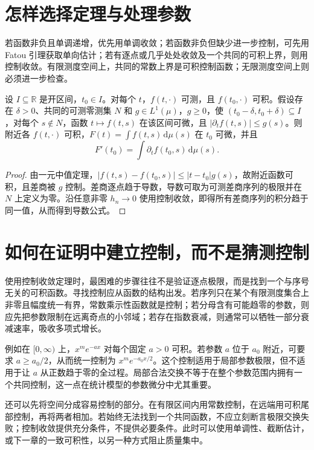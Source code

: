 \documentclass[UTF8,12pt,a4paper,fontset=fandol]{ctexbook}
\begin{document}
\section{怎样选择定理与处理参数}
若函数非负且单调递增，优先用单调收敛；若函数非负但缺少进一步控制，可先用 Fatou 引理获取单向估计；若有逐点或几乎处处收敛及一个共同的可积上界，则用控制收敛。有限测度空间上，共同的常数上界是可积控制函数；无限测度空间上则必须进一步检查。

\begin{proposition}[一个积分号下求导的充分条件]
设 $I\subseteq\mathbb R$ 是开区间，$t_0\in I$。对每个 $t$，$f(t,\cdot)$ 可测，且 $f(t_0,\cdot)$ 可积。假设存在 $\delta>0$、共同的可测零测集 $N$ 和 $g\in L^1(\mu)$，$g\geq0$，使 $(t_0-\delta,t_0+\delta)\subseteq I$，对每个 $s\notin N$，函数 $t\mapsto f(t,s)$ 在该区间可微，且 $|\partial_tf(t,s)|\leq g(s)$。则附近各 $f(t,\cdot)$ 可积，$F(t)=\int f(t,s)\,\mathrm d\mu(s)$ 在 $t_0$ 可微，并且
\[
 F'(t_0)=\int\partial_tf(t_0,s)\,\mathrm d\mu(s).
\]
\end{proposition}
\begin{proof}
由一元中值定理，$|f(t,s)-f(t_0,s)|\leq|t-t_0|g(s)$，故附近函数可积，且差商被 $g$ 控制。差商逐点趋于导数，导数可取为可测差商序列的极限并在 $N$ 上定义为零。沿任意非零 $h_n\to0$ 使用控制收敛，即得所有差商序列的积分趋于同一值，从而得到导数公式。
\end{proof}

\section{如何在证明中建立控制，而不是猜测控制}
使用控制收敛定理时，最困难的步骤往往不是验证逐点极限，而是找到一个与序号无关的可积函数。寻找控制应从函数的结构出发。若序列只在某个有限测度集合上非零且幅度统一有界，常数乘示性函数就是控制；若分母含有可能趋零的参数，则应先把参数限制在远离奇点的小邻域；若存在指数衰减，则通常可以牺牲一部分衰减速率，吸收多项式增长。

例如在 $[0,\infty)$ 上，$x^m e^{-ax}$ 对每个固定 $a>0$ 可积。若参数 $a$ 位于 $a_0$ 附近，可要求 $a\geq a_0/2$，从而统一控制为 $x^m e^{-a_0x/2}$。这个控制适用于局部参数极限，但不适用于让 $a$ 从正数趋于零的全过程。局部合法交换不等于在整个参数范围内拥有一个共同控制，这一点在统计模型的参数微分中尤其重要。

还可以先将空间分成容易控制的部分。在有限区间内用常数控制，在远端用可积尾部控制，再将两者相加。若始终无法找到一个共同函数，不应立刻断言极限交换失败；控制收敛提供充分条件，不提供必要条件。此时可以使用单调性、截断估计，或下一章的一致可积性，以另一种方式阻止质量集中。
\end{document}
